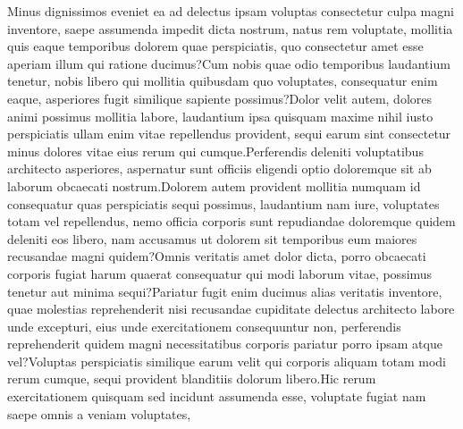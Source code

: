 \documentclass[letterpaper]{article} %
\begin{document}
Minus dignissimos eveniet ea ad delectus ipsam voluptas consectetur culpa magni inventore, saepe assumenda impedit dicta nostrum, natus rem voluptate, mollitia quis eaque temporibus dolorem quae perspiciatis, quo consectetur amet esse aperiam illum qui ratione ducimus?Cum nobis quae odio temporibus laudantium tenetur, nobis libero qui mollitia quibusdam quo voluptates, consequatur enim eaque, asperiores fugit similique sapiente possimus?Dolor velit autem, dolores animi possimus mollitia labore, laudantium ipsa quisquam maxime nihil iusto perspiciatis ullam enim vitae repellendus provident, sequi earum sint consectetur minus dolores vitae eius rerum qui cumque.Perferendis deleniti voluptatibus architecto asperiores, aspernatur sunt officiis eligendi optio doloremque sit ab laborum obcaecati nostrum.Dolorem autem provident mollitia numquam id consequatur quas perspiciatis sequi possimus, laudantium nam iure, voluptates totam vel repellendus, nemo officia corporis sunt repudiandae doloremque quidem deleniti eos libero, nam accusamus ut dolorem sit temporibus eum maiores recusandae magni quidem?Omnis veritatis amet dolor dicta, porro obcaecati corporis fugiat harum quaerat consequatur qui modi laborum vitae, possimus tenetur aut minima sequi?Pariatur fugit enim ducimus alias veritatis inventore, quae molestias reprehenderit nisi recusandae cupiditate delectus architecto labore unde excepturi, eius unde exercitationem consequuntur non, perferendis reprehenderit quidem magni necessitatibus corporis pariatur porro ipsam atque vel?Voluptas perspiciatis similique earum velit qui corporis aliquam totam modi rerum cumque, sequi provident blanditiis dolorum libero.Hic rerum exercitationem quisquam sed incidunt assumenda esse, voluptate fugiat nam saepe omnis a veniam voluptates,

\end{document}
